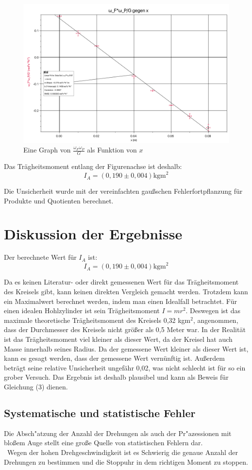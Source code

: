\documentclass[11pt,a4paper]{article} %
\begin{document}
\begin{figure}
	\newpage
	\centering
	\includegraphics[width=\linewidth]{Abb1}
	\caption{Eine Graph von $\frac{\omega_F\omega_P}{G}$ als Funktion von $x$}
\end{figure}
Das Trägheitsmoment entlang der Figurenachse ist deshalb:
$$I_A = (0,190 \pm 0,004) \textrm{kgm}^2$$

Die Unsicherheit wurde mit der vereinfachten gaußschen Fehlerfortpflanzung für Produkte und Quotienten berechnet. 
\section{Diskussion der Ergebnisse}
Der berechnete Wert für $I_A$ ist:
$$I_A = (0,190 \pm 0,004) \textrm{kgm}^2$$

Da es keinen Literatur- oder direkt gemessenen Wert für das Trägheitsmoment des Kreisels gibt, kann keinen direkten Vergleich gemacht werden. Trotzdem kann ein Maximalwert berechnet werden, indem man einen Idealfall betrachtet. Für einen idealen Hohlzylinder ist sein Trägheitsmoment $I = mr^2$. Deswegen ist das maximale theoretische Trägheitsmoment des Kreisels 0,32 kgm$^2$, angenommen, dass der Durchmesser des Kreisels nicht größer als 0,5 Meter war. In der Realität ist das Trägheitsmoment viel kleiner als dieser Wert, da der Kreisel hat auch Masse innerhalb seines Radius. Da der gemessene Wert kleiner als dieser Wert ist, kann es gesagt werden, dass der gemessene Wert vernünftig ist. Außerdem beträgt seine relative Unsicherheit ungefähr 0,02, was nicht schlecht ist für so ein grober Versuch. Das Ergebnis ist deshalb plausibel und kann als Beweis für Gleichung (3) dienen. 

\subsection{Systematische und statistische Fehler}
Die Absch"atzung der Anzahl der Drehungen als auch der Pr"azessionen mit bloßem Auge stellt eine große Quelle von statistischen Fehlern dar.
\\\
Wegen der hohen Drehgeschwindigkeit ist es  Schwierig die genaue Anzahl der Drehungen zu bestimmen und die Stoppuhr in dem richtigen Moment zu stoppen.
\end{document}
